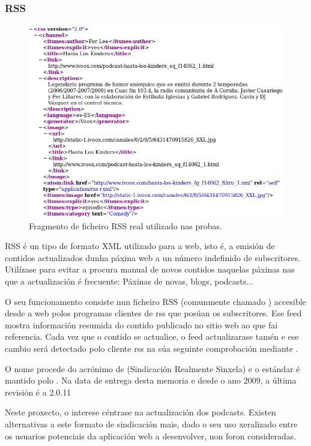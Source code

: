 \subsubsection{RSS}
\label{rss}

\begin{figure}[h]
	\centering
	\includegraphics[scale=0.6,keepaspectratio=true]{./images/hlk_rss.png}
	\caption{Fragmento de ficheiro RSS real utilizado nas probas.}
	\label{fig:rss}
\end{figure}

RSS é un tipo de formato XML utilizado para a  web, isto é, a emisión de contidos actualizados dunha páxina web a un número indefinido de subscritores. Utilízase para evitar a procura manual de novos contidos naquelas páxinas nas que a actualización é frecuente: Páxinas de novas, blogs, podcasts... 

O seu funcionamento consiste nun ficheiro RSS (comunmente chamado ) accesible desde a web polos programas clientes de rss que posúan os subscritores. Ese feed mostra información resumida do contido publicado no sitio web ao que fai referencia. Cada vez que o contido se actualice, o feed actualizarase tamén e ese cambio será detectado polo cliente rss na súa seguinte comprobación mediante .
 
O nome procede do acrónimo de (Sindicación Realmente Sinxela) e o estándar é mantido polo . Na data de entrega desta memoria e desde o ano 2009, a última revisión é a 2.0.11 \cite{rss}

Neste proxecto, o interese céntrase na actualización dos podcasts. Existen alternativas a este formato de sindicación mais, dado o seu uso xeralizado entre os usuarios potenciais da aplicación web a desenvolver, non foron consideradas.


